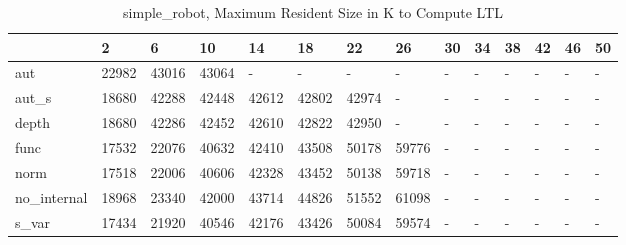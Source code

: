\begin{table}
\caption{simple_robot, Maximum Resident Size in K to Compute LTL}
\label{simple_robot_LTL_size}
\begin{tabular}{llllllllllllll}
\toprule
 & 2 & 6 & 10 & 14 & 18 & 22 & 26 & 30 & 34 & 38 & 42 & 46 & 50 \\
\midrule
aut & 22982 & 43016 & 43064 & - & - & - & - & - & - & - & - & - & - \\
aut_s & 18680 & 42288 & 42448 & 42612 & 42802 & 42974 & - & - & - & - & - & - & - \\
depth & 18680 & 42286 & 42452 & 42610 & 42822 & 42950 & - & - & - & - & - & - & - \\
func & 17532 & 22076 & 40632 & 42410 & 43508 & 50178 & 59776 & - & - & - & - & - & - \\
norm & 17518 & 22006 & 40606 & 42328 & 43452 & 50138 & 59718 & - & - & - & - & - & - \\
no_internal & 18968 & 23340 & 42000 & 43714 & 44826 & 51552 & 61098 & - & - & - & - & - & - \\
s_var & 17434 & 21920 & 40546 & 42176 & 43426 & 50084 & 59574 & - & - & - & - & - & - \\
\bottomrule
\end{tabular}
\end{table}
